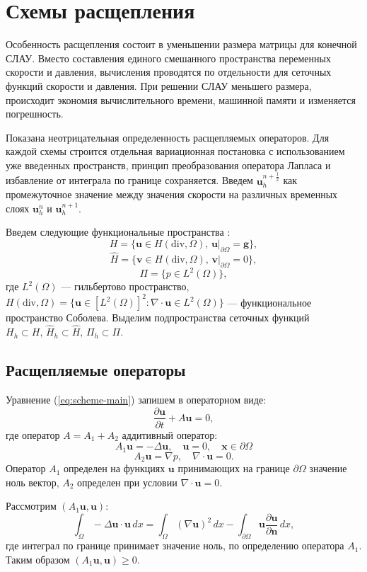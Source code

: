 \documentclass[12pt]{article}
\begin{document}
\section{Схемы расщепления}
Особенность расщепления состоит в уменьшении размера матрицы для конечной СЛАУ. Вместо составления единого смешанного пространства переменных скорости и давления, вычисления проводятся по отдельности для сеточных функций скорости и давления. При решении СЛАУ меньшего размера, происходит экономия вычислительного времени, машинной памяти и изменяется погрешность.

Показана неотрицательная определенность расщепляемых операторов.
Для каждой схемы строится отдельная вариационная постановка с использованием уже введенных пространств, принцип преобразования оператора Лапласа и избавление от интеграла по границе сохраняется. Введем ${\bm u}_h^{n+\frac{1}{2}}$ как промежуточное значение между значения скорости на различных временных слоях ${\bm u}_h^n$ и ${\bm u}_h^{n+1}$.

Введем следующие функциональные пространства \cite{guzman-2011}:
$$
H=\{ {\bm u} \in H(\mathrm{div}, \Omega), \, {\bm u}|_{\partial \Omega}= {\bm g} \},
$$
$$
\hat{H}=\{ {\bm v} \in H(\mathrm{div}, \Omega), \, {\bm v}|_{\partial \Omega}=0 \},
$$
$$
\Pi=\{ p \in L^2(\Omega) \},
$$
где $L^2(\Omega)$ --- гильбертово пространство, $H(\mathrm{div}, \Omega) = \{{\bm u} \in [L^2(\Omega)]^2 : \nabla\cdot {\bm u} \in L^2(\Omega)\}$ --- функциональное пространство Соболева. Выделим подпространства сеточных функций $H_h \subset H, \, \hat{H}_h \subset \hat{H}, \, \Pi_h \subset \Pi$.

\subsection{Расщепляемые операторы}
Уравнение (\ref{eq:scheme-main}) запишем в операторном виде:
$$
\frac{\partial {\bm u}}{\partial t} + A {\bm u} = 0,
$$
где оператор $A=A_1 + A_2$ аддитивный оператор:
$$A_1 {\bm u} = - \Delta {\bm u}, \quad {\bm u} = 0, \quad {\bm x} \in {\partial \Omega}$$
\begin{equation}
\label{eq:operator-A2}
A_2 {\bm u} = \nabla p, \quad \nabla \cdot {\bm u} = 0.
\end{equation}
Оператор $A_1$ определен на функциях ${\bm u}$ принимающих на границе $\partial \Omega$ значение ноль вектор, $A_2$ определен при условии $\nabla \cdot {\bm u} = 0.$

Рассмотрим $(A_1 {\bm u}, {\bm u})$:
$$
\int_{\Omega} -\Delta {\bm u} \cdot {\bm u} \, dx = \int_{\Omega} (\nabla {\bm u})^2 \, dx - \int_{\partial \Omega} {\bm u} \frac{\partial {\bm u}}{\partial {\bm n}} \, dx,
$$
где интеграл по границе принимает значение ноль, по определению оператора $A_1$. Таким образом $(A_1 {\bm u}, {\bm u}) \geq 0$.
\end{document}
